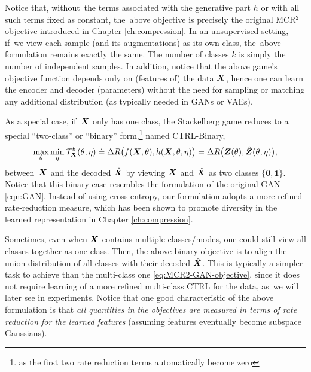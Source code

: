 \documentclass[../../book-main.tex]{subfiles}
\begin{document}


Notice that, without~the terms associated with the generative part $h$ or with all such terms fixed as constant, the~above objective is precisely the original MCR$^2$ objective introduced in Chapter \ref{ch:compression}. In an unsupervised setting, if~we view each sample (and its augmentations) as its own class, the~above formulation remains exactly the same. The number of classes $k$ is simply the number of independent samples. In addition, notice that the above game's objective function depends only on (features of) the data $\bm{X}$, hence one can learn the encoder and decoder (parameters) without the need for sampling or matching any additional distribution (as typically needed in GANs or VAEs).

As a special case, if~$\bm{X}$ only has one class, the Stackelberg game reduces to a special ``two-class'' or ``binary''  form,\footnote{as the first two rate reduction terms automatically become zero} named CTRL-Binary, 
\begin{equation}
 \max_\theta \min_\eta \mathcal{T}^b_{\bm{X}}(\theta, \eta) \doteq \Delta R\big(f(\bm{X},\theta), h(\bm{X},\theta,\eta)\big) = \Delta R\big(\bm{Z}(\theta), \hat {\bm{Z}}(\theta, \eta)\big), 
    \label{eq:MCR2-GAN-objective-binary}
\end{equation}
between~$\bm{X}$ and the decoded $\hat{\bm{X}}$ by viewing $\bm{X}$ and $\hat {\bm{X}}$ as two classes $\{\bm 0, \bm 1\}$. Notice that this binary case resembles the formulation of the original GAN \eqref{eqn:GAN}. Instead of using cross entropy, our formulation adopts a more refined rate-reduction measure, which has been shown to promote diversity in the learned representation in Chapter \ref{ch:compression}. %

Sometimes, even when $\bm{X}$ contains multiple classes/modes, one could still view all classes together as one class. Then, the above binary objective is to align the union distribution of all classes with their decoded $\hat {\bm{X}}$. This is typically a simpler task to achieve than the multi-class one \eqref{eq:MCR2-GAN-objective}, since it does not require learning of a more refined multi-class CTRL for the data, as~we will later see in experiments. Notice that one good characteristic of the above formulation is that {\em all quantities in the objectives are measured in terms of rate reduction for the learned features} (assuming features eventually become subspace Gaussians). 
\end{document}
